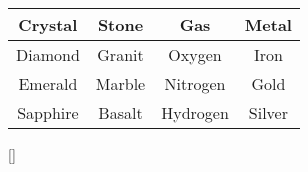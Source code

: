 \begin{table}[h]
\centering
\begin{tabular}{||c c c c||} 
 \hline
 Crystal & Stone & Gas & Metal \\ 
 \hline\hline
 Diamond & Granit & Oxygen & Iron \\ 
 \hline
 Emerald & Marble & Nitrogen & Gold \\
 \hline
 Sapphire & Basalt & Hydrogen & Silver \\
 \hline
\end{tabular}
\label{tab:minerals}[]
\end{table}